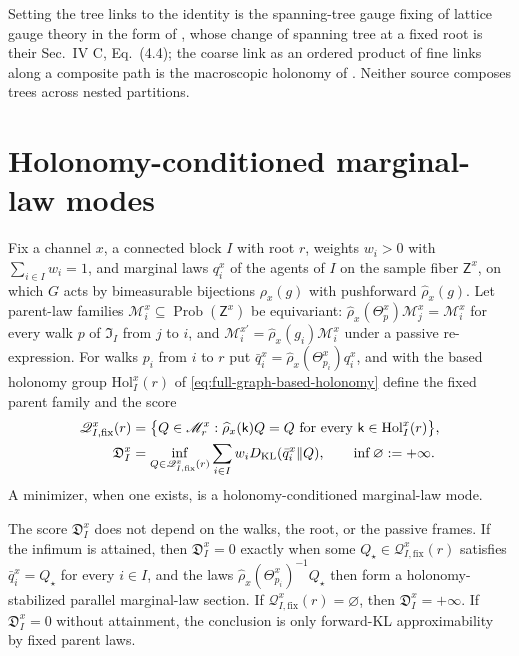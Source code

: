 Setting the tree links to the identity is the spanning-tree gauge fixing of lattice gauge theory in
the form of \citet[Sec.~IV A, Eq.~(4.1)]{DelcampDittrich2017PhaseDiagram}, whose change of spanning
tree at a fixed root is their Sec.~IV C, Eq.~(4.4); the coarse link as an ordered product of fine links
along a composite path is the macroscopic holonomy of
\citet[Sec.~4, Eq.~(4.1)]{Bahr2012OperatorSpinFoams}. Neither source composes trees across nested
partitions.

\section{Holonomy-conditioned marginal-law modes}
\label{sec:cg-holonomy-law-modes}

Fix a channel $x$, a connected block $I$ with root $r$, weights $w_i>0$ with $\sum_{i\in I}w_i=1$, and
marginal laws $q^x_i$ of the agents of $I$ on the sample fiber $\mathsf Z^x$, on which $G$ acts by
bimeasurable bijections $\rho_x(g)$ with pushforward $\widehat\rho_x(g)$. Let parent-law families
$\mathscr M^x_i\subseteq\operatorname{Prob}(\mathsf Z^x)$ be equivariant:
$\widehat\rho_x(\Theta^x_p)\mathscr M^x_j=\mathscr M^x_i$ for every walk $p$ of $\mathfrak I_I$ from $j$ to
$i$, and $\mathscr M^{x\prime}_i=\widehat\rho_x(g_i)\mathscr M^x_i$ under a passive re-expression. For walks
$p_i$ from $i$ to $r$ put $\bar q^x_i=\widehat\rho_x(\Theta^x_{p_i})q^x_i$, and with the based holonomy
group $\mathrm{Hol}^x_I(r)$ of \eqref{eq:full-graph-based-holonomy} define the fixed parent family and the
score
\begin{align}
\mathscr Q^x_{I,\mathrm{fix}}(r)&=\bigl\{Q\in\mathscr M^x_r:\widehat\rho_x(\mathsf k)Q=Q
\text{ for every }\mathsf k\in\mathrm{Hol}^x_I(r)\bigr\},
\label{eq:cg-holonomy-fixed-parent}\\
\mathfrak D^x_I&=\inf_{Q\in\mathscr Q^x_{I,\mathrm{fix}}(r)}\sum_{i\in I}w_iD_{\mathrm{KL}}(\bar q^x_i\Vert Q),
\qquad\inf\varnothing:=+\infty.
\label{eq:cg-holonomy-kl-score}
\end{align}
A minimizer, when one exists, is a holonomy-conditioned marginal-law mode.

The score $\mathfrak D^x_I$ does not depend on the walks, the root, or the passive frames. If the infimum
is attained, then $\mathfrak D^x_I=0$ exactly when some $Q_\star\in\mathscr Q^x_{I,\mathrm{fix}}(r)$
satisfies $\bar q^x_i=Q_\star$ for every $i\in I$, and the laws $\widehat\rho_x(\Theta^x_{p_i})^{-1}Q_\star$
then form a holonomy-stabilized parallel marginal-law section. If $\mathscr Q^x_{I,\mathrm{fix}}(r)=\varnothing$,
then $\mathfrak D^x_I=+\infty$. If $\mathfrak D^x_I=0$ without attainment, the conclusion is only forward-KL
approximability by fixed parent laws. 

